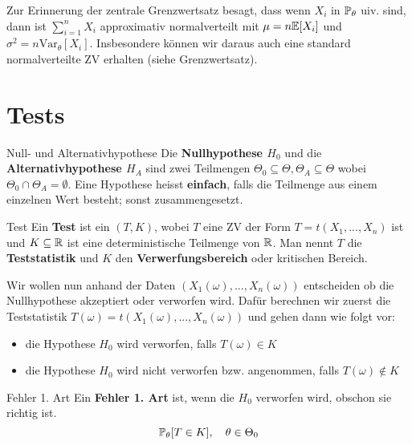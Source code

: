 Zur Erinnerung der zentrale Grenzwertsatz besagt, dass wenn $X_i$ in $\mathbb{P}_\theta$ uiv. sind, dann ist $\sum_{i=1}^n X_i$ approximativ normalverteilt mit $\mu = n \mathbb{E}[X_i]$ und $\sigma^2 = n \text{Var}_\theta[X_i]$. Insbesondere können wir daraus auch eine standard normalverteilte ZV erhalten (siehe Grenzwertsatz).


\section*{Tests}



\begin{mainbox}{Null- und Alternativhypothese}
    Die \textbf{Nullhypothese $H_0$} und die \textbf{Alternativhypothese $H_A$} sind zwei Teilmengen $\Theta_0 \subseteq \Theta, \Theta_A \subseteq \Theta$ wobei $\Theta_0 \cap \Theta_A = \emptyset$. Eine Hypothese heisst \textbf{einfach}, falls die Teilmenge aus einem einzelnen Wert besteht; sonst zusammengesetzt.
\end{mainbox}



\begin{mainbox}{Test}
    Ein \textbf{Test} ist ein $(T, K)$, wobei $T$ eine ZV der Form $T = t(X_1,...,X_n)$ ist und $K \subseteq \mathbb{R}$ ist eine deterministische Teilmenge von $\mathbb{R}$. Man nennt $T$ die \textbf{Teststatistik} und $K$ den \textbf{Verwerfungsbereich} oder kritischen Bereich.
\end{mainbox}

Wir wollen nun anhand der Daten $(X_1(\omega), ..., X_n(\omega))$ entscheiden ob die Nullhypothese akzeptiert oder verworfen wird. Dafür berechnen wir zuerst die Teststatistik $T(\omega) = t(X_1(\omega), ..., X_n(\omega))$ und gehen dann wie folgt vor:
\begin{itemize}
    \item die Hypothese $H_0$ wird verworfen, falls $T(\omega) \in K$
    \item die Hypothese $H_0$ wird nicht verworfen bzw. angenommen, falls $T(\omega) \notin K$
\end{itemize}

\begin{subbox}{Fehler 1. Art}
    Ein \textbf{Fehler 1. Art} ist, wenn die $H_0$ verworfen wird, obschon sie richtig ist.
    $$\mathbb{P}_\theta[T \in K], \quad \theta \in \Theta_0$$
\end{subbox}



